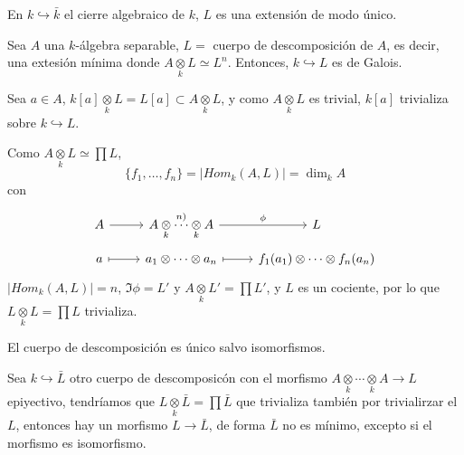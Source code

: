 \begin{cor}
    En $k \hookrightarrow \bar k$ el cierre algebraico de $k$, $L$ es una extensi\'on de modo \'unico. 
\end{cor}
\begin{prop}
    Sea $A$ una $k$-\'algebra separable, $L=$ cuerpo de descomposici\'on de $A$, es decir, una extesi\'on m\'inima donde $A\underset{k}{\otimes}L \simeq L^n$. Entonces, $k \hookrightarrow L$ es de Galois.
\end{prop}
\begin{dem}
    Sea $a\in A$, $k[a] \underset{k}{\otimes}L = L[a]\subset A \underset{k}{\otimes}L$, y como $A \underset{k}{\otimes}L$ es trivial, $k[a]$ trivializa sobre $k\hookrightarrow L$.

   Como $A\underset{k}{\otimes}L \simeq \prod L$, 
   $$\{f_1, \ldots, f_n\} = |Hom_{k}(A,L)| = \dim_k A$$
   con 
   $$\bt A \rar & A \underset{k}{\otimes}\overset{n)}{\cdots} \underset{k}{\otimes}A \rar{\phi} & L \\[-5mm] a \rarmaps & a_1 \otimes \cdots \otimes a_n \rarmaps & f_1(a_1) \otimes \cdots \otimes f_n(a_n) \et$$
    $|Hom_k(A,L)|=n$, $\Im \phi = L'$ y $A\underset{k}{\otimes}L' = \prod L'$, y $L$ es un cociente, por lo que $L\underset{k}{\otimes}L = \prod L$ trivializa. 
\end{dem}
\begin{lem}
    El cuerpo de descomposici\'on es \'unico salvo isomorfismos.
\end{lem}
\begin{dem}
    Sea $k \hookrightarrow \bar L$ otro cuerpo de descomposic\'on con el morfismo $A\underset{k}{\otimes}\cdots \underset{k}{\otimes}A \longrightarrow L$ epiyectivo, tendr\'iamos que $L \underset{k}{\otimes}\bar L = \prod \bar L$ que trivializa tambi\'en por trivialirzar el $L$, entonces hay un morfismo $L \longrightarrow \bar L$, de forma $\bar L$ no es m\'inimo, excepto si el morfismo es isomorfismo.
\end{dem}
